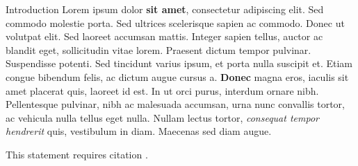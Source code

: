 \documentclass{beamer}
\newlength{\onecolwid}
\begin{document}
\begin{frame}[t]{}
\begin{columns}[t]
\begin{column}{\onecolwid}
\begin{block}{Introduction}
			Lorem ipsum dolor \textbf{sit amet}, consectetur adipiscing elit. Sed commodo molestie porta. Sed ultrices scelerisque sapien ac commodo. Donec ut volutpat elit. Sed laoreet accumsan mattis. Integer sapien tellus, auctor ac blandit eget, sollicitudin vitae lorem. Praesent dictum tempor pulvinar. Suspendisse potenti. Sed tincidunt varius ipsum, et porta nulla suscipit et. Etiam congue bibendum felis, ac dictum augue cursus a. \textbf{Donec} magna eros, iaculis sit amet placerat quis, laoreet id est. In ut orci purus, interdum ornare nibh. Pellentesque pulvinar, nibh ac malesuada accumsan, urna nunc convallis tortor, ac vehicula nulla tellus eget nulla. Nullam lectus tortor, \textit{consequat tempor hendrerit} quis, vestibulum in diam. Maecenas sed diam augue.

			This statement requires citation \cite{Smith:2012qr}.


\end{block}
\end{column}
\end{columns}
\end{frame}
\end{document}
